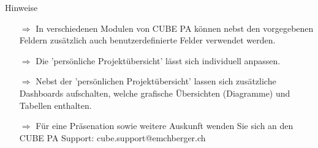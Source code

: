 \documentclass{article}
\begin{document}
\begin{beamerlikethm}{Hinweise}
\begin{itemize}
  \item[$\Longrightarrow$] In verschiedenen Modulen von CUBE PA können nebst den vorgegebenen Feldern zusätzlich auch benutzerdefinierte Felder verwendet werden.
  \item[$\Longrightarrow$] Die 'persönliche Projektübersicht' lässt sich individuell anpassen. 
	\item[$\Longrightarrow$] Nebst der 'persönlichen Projektübersicht' lassen sich zusätzliche Dashboards aufschalten, welche grafische Übersichten (Diagramme) und Tabellen enthalten.
	\item[$\Longrightarrow$] Für eine Präsenation sowie weitere Auskunft wenden Sie sich an den CUBE PA Support: {\color{red} cube.support@emchberger.ch}
	
\end{itemize}
\end{beamerlikethm}



\pagebreak
{}

\vspace{\baselineskip}

\end{document}
